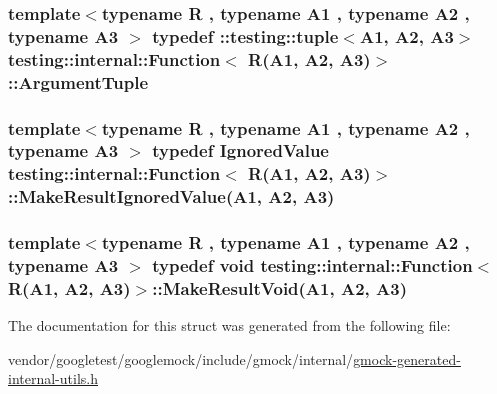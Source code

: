 \subsubsection[{\texorpdfstring{Argument\+Tuple}{ArgumentTuple}}]{\setlength{\rightskip}{0pt plus 5cm}template$<$typename R , typename A1 , typename A2 , typename A3 $>$ typedef \+::testing\+::tuple$<$A1, A2, A3$>$ {\bf testing\+::internal\+::\+Function}$<$ R(A1, A2, A3)$>$\+::{\bf Argument\+Tuple}}\hypertarget{structtesting_1_1internal_1_1Function_3_01R_07A1_00_01A2_00_01A3_08_4_a6f1e1097947a9e13a4e29099a61de804}{}\label{structtesting_1_1internal_1_1Function_3_01R_07A1_00_01A2_00_01A3_08_4_a6f1e1097947a9e13a4e29099a61de804}
\subsubsection[{\texorpdfstring{Make\+Result\+Ignored\+Value}{MakeResultIgnoredValue}}]{\setlength{\rightskip}{0pt plus 5cm}template$<$typename R , typename A1 , typename A2 , typename A3 $>$ typedef {\bf Ignored\+Value} {\bf testing\+::internal\+::\+Function}$<$ R(A1, A2, A3)$>$\+::Make\+Result\+Ignored\+Value(A1, A2, A3)}\hypertarget{structtesting_1_1internal_1_1Function_3_01R_07A1_00_01A2_00_01A3_08_4_abff7468ae8231766e7b396c8a407cb5a}{}\label{structtesting_1_1internal_1_1Function_3_01R_07A1_00_01A2_00_01A3_08_4_abff7468ae8231766e7b396c8a407cb5a}
\subsubsection[{\texorpdfstring{Make\+Result\+Void}{MakeResultVoid}}]{\setlength{\rightskip}{0pt plus 5cm}template$<$typename R , typename A1 , typename A2 , typename A3 $>$ typedef void {\bf testing\+::internal\+::\+Function}$<$ R(A1, A2, A3)$>$\+::Make\+Result\+Void(A1, A2, A3)}\hypertarget{structtesting_1_1internal_1_1Function_3_01R_07A1_00_01A2_00_01A3_08_4_a6b9f583a9ef6755cc92ce2b7fa255b84}{}\label{structtesting_1_1internal_1_1Function_3_01R_07A1_00_01A2_00_01A3_08_4_a6b9f583a9ef6755cc92ce2b7fa255b84}


The documentation for this struct was generated from the following file\+:\begin{DoxyCompactItemize}
\item 
vendor/googletest/googlemock/include/gmock/internal/\hyperlink{gmock-generated-internal-utils_8h}{gmock-\/generated-\/internal-\/utils.\+h}\end{DoxyCompactItemize}
